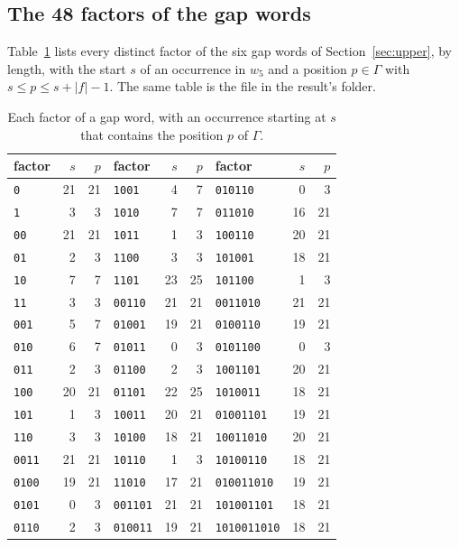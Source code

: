 \documentclass[11pt]{article}
\theoremstyle{remark}
\newcommand{\file}[1]{\texttt{\detokenize{#1}}}
\begin{document}
\begin{appendices}

\section{The 48 factors of the gap words}\label{app:table}

Table~\ref{tab:gaps} lists every distinct factor of the six gap words of
Section~\ref{sec:upper}, by length, with the start $s$ of an occurrence in
$w_5$ and a position $p\in\Gamma$ with $s\leq p\leq s+|f|-1$. The same table
is the file \file{data/upper-bound.json} in the result's folder.

\begin{table}[ht]
\centering\small
\begin{tabular}{@{}lrr@{\qquad}lrr@{\qquad}lrr@{}}
\toprule
factor & $s$ & $p$ & factor & $s$ & $p$ & factor & $s$ & $p$\\
\midrule
\texttt{0} & 21 & 21 & \texttt{1001} & 4 & 7 & \texttt{010110} & 0 & 3 \\
\texttt{1} & 3 & 3 & \texttt{1010} & 7 & 7 & \texttt{011010} & 16 & 21 \\
\texttt{00} & 21 & 21 & \texttt{1011} & 1 & 3 & \texttt{100110} & 20 & 21 \\
\texttt{01} & 2 & 3 & \texttt{1100} & 3 & 3 & \texttt{101001} & 18 & 21 \\
\texttt{10} & 7 & 7 & \texttt{1101} & 23 & 25 & \texttt{101100} & 1 & 3 \\
\texttt{11} & 3 & 3 & \texttt{00110} & 21 & 21 & \texttt{0011010} & 21 & 21 \\
\texttt{001} & 5 & 7 & \texttt{01001} & 19 & 21 & \texttt{0100110} & 19 & 21 \\
\texttt{010} & 6 & 7 & \texttt{01011} & 0 & 3 & \texttt{0101100} & 0 & 3 \\
\texttt{011} & 2 & 3 & \texttt{01100} & 2 & 3 & \texttt{1001101} & 20 & 21 \\
\texttt{100} & 20 & 21 & \texttt{01101} & 22 & 25 & \texttt{1010011} & 18 & 21 \\
\texttt{101} & 1 & 3 & \texttt{10011} & 20 & 21 & \texttt{01001101} & 19 & 21 \\
\texttt{110} & 3 & 3 & \texttt{10100} & 18 & 21 & \texttt{10011010} & 20 & 21 \\
\texttt{0011} & 21 & 21 & \texttt{10110} & 1 & 3 & \texttt{10100110} & 18 & 21 \\
\texttt{0100} & 19 & 21 & \texttt{11010} & 17 & 21 & \texttt{010011010} & 19 & 21 \\
\texttt{0101} & 0 & 3 & \texttt{001101} & 21 & 21 & \texttt{101001101} & 18 & 21 \\
\texttt{0110} & 2 & 3 & \texttt{010011} & 19 & 21 & \texttt{1010011010} & 18 & 21 \\
\bottomrule
\end{tabular}
\caption{Each factor of a gap word, with an occurrence starting at $s$ that
contains the position $p$ of $\Gamma$.}
\label{tab:gaps}
\end{table}


\end{appendices}
\end{document}
